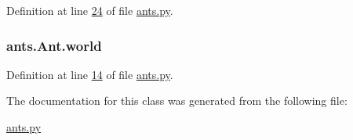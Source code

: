 Definition at line \hyperlink{ants_8py_source_l00024}{24} of file \hyperlink{ants_8py_source}{ants.\+py}.

\hypertarget{classants_1_1Ant_a55f64c7cafb3806bdcfda42586adbff5}{
\subsubsection[{world}]{\setlength{\rightskip}{0pt plus 5cm}ants.\+Ant.\+world}}\label{classants_1_1Ant_a55f64c7cafb3806bdcfda42586adbff5}


Definition at line \hyperlink{ants_8py_source_l00014}{14} of file \hyperlink{ants_8py_source}{ants.\+py}.



The documentation for this class was generated from the following file\+:\begin{DoxyCompactItemize}
\item 
\hyperlink{ants_8py}{ants.\+py}\end{DoxyCompactItemize}
